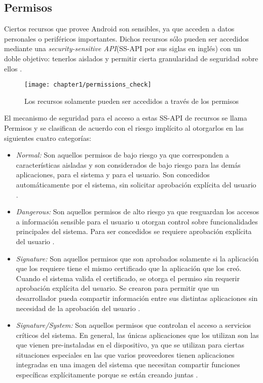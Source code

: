 \subsection{Permisos} \label{ch01-permisos}
Ciertos recursos que provee Android son sensibles, ya que acceden a datos personales o periféricos importantes. Dichos recursos sólo pueden ser accedidos mediante una \textit{security-sensitive API}(SS-API por sus siglas en inglés) con un doble objetivo: tenerlos aislados y permitir cierta granularidad de seguridad sobre ellos \cite{HYGZD2014}.\\
\begin{figure}[hbtp]
	\begin{center}
		\texttt{[image: chapter1/permissions\_check]}
		\caption{Los recursos solamente pueden ser accedidos a través de los permisos}
		\label{fig:ch01:permissions-check}
	\end{center}
\end{figure}
El mecanismo de seguridad para el acceso a estas SS-API de recursos se llama Permisos y se clasifican de acuerdo con el riesgo implícito al otorgarlos en las siguientes cuatro categorías:
\begin{itemize}
    \item \emph{Normal:} Son aquellos permisos de bajo riesgo ya que corresponden a características aisladas y son considerados de bajo riesgo para las demás aplicaciones, para el sistema y para el usuario. Son concedidos automáticamente por el sistema, sin solicitar aprobación explícita del usuario \cite{Rom14}.
    \item \emph{Dangerous:} Son aquellos permisos de alto riesgo ya que resguardan los accesos a información sensible para el usuario u otorgan control sobre funcionalidades principales del sistema. Para ser concedidos se requiere aprobación explícita del usuario \cite{Rom14}. 
    \item \emph{Signature:} Son aquellos permisos que son aprobados solamente si la aplicación que los requiere tiene el mismo certificado que la aplicación que los creó. Cuando el sistema valida el certificado, se otorga el permiso sin requerir aprobación explícita del usuario. Se crearon para permitir que un desarrollador pueda compartir información entre sus distintas aplicaciones sin necesidad de la aprobación del usuario \cite{Rom14}.
    \item \emph{Signature/System:} Son aquellos permisos que controlan el acceso a servicios críticos del sistema. En general, las únicas aplicaciones que los utilizan son las que vienen pre-instaladas en el dispositivo, ya que se utilizan para ciertas situaciones especiales en las que varios proveedores tienen aplicaciones integradas en una imagen del sistema que necesitan compartir funciones específicas explícitamente porque se están creando juntas \cite{Rom14}.
\end{itemize}

